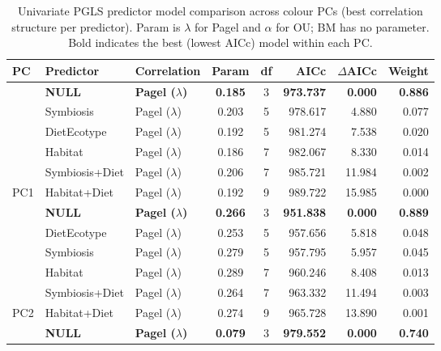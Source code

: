 \begin{table}[!h]
\centering
\caption{\label{tab:tab:color_pred_model_comparison_combined}Univariate PGLS predictor model comparison across colour PCs (best correlation structure per predictor). Param is $\lambda$ for Pagel and $\alpha$ for OU; BM has no parameter. Bold indicates the best (lowest AICc) model within each PC.}
\centering
\begin{tabular}[t]{lllccrrr}
\toprule
PC & Predictor & Correlation & Param & df & AICc & $\Delta$AICc & Weight\\
\midrule
 & \textbf{NULL} & \textbf{Pagel ($\lambda$)} & \textbf{0.185} & 3 & \textbf{973.737} & \textbf{0.000} & \textbf{0.886}\\

 & Symbiosis & Pagel ($\lambda$) & 0.203 & 5 & 978.617 & 4.880 & 0.077\\

 & DietEcotype & Pagel ($\lambda$) & 0.192 & 5 & 981.274 & 7.538 & 0.020\\

 & Habitat & Pagel ($\lambda$) & 0.186 & 7 & 982.067 & 8.330 & 0.014\\

 & Symbiosis+Diet & Pagel ($\lambda$) & 0.206 & 7 & 985.721 & 11.984 & 0.002\\

\multirow{-6}{*}{\raggedright\arraybackslash PC1} & Habitat+Diet & Pagel ($\lambda$) & 0.192 & 9 & 989.722 & 15.985 & 0.000\\
\cmidrule{1-8}
 & \textbf{NULL} & \textbf{Pagel ($\lambda$)} & \textbf{0.266} & 3 & \textbf{951.838} & \textbf{0.000} & \textbf{0.889}\\

 & DietEcotype & Pagel ($\lambda$) & 0.253 & 5 & 957.656 & 5.818 & 0.048\\

 & Symbiosis & Pagel ($\lambda$) & 0.279 & 5 & 957.795 & 5.957 & 0.045\\

 & Habitat & Pagel ($\lambda$) & 0.289 & 7 & 960.246 & 8.408 & 0.013\\

 & Symbiosis+Diet & Pagel ($\lambda$) & 0.264 & 7 & 963.332 & 11.494 & 0.003\\

\multirow{-6}{*}{\raggedright\arraybackslash PC2} & Habitat+Diet & Pagel ($\lambda$) & 0.274 & 9 & 965.728 & 13.890 & 0.001\\
\cmidrule{1-8}
 & \textbf{NULL} & \textbf{Pagel ($\lambda$)} & \textbf{0.079} & 3 & \textbf{979.552} & \textbf{0.000} & \textbf{0.740}\\


\end{tabular}
\end{table}

